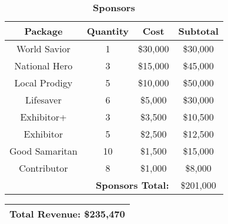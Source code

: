 \vspace{10mm}

\begin{table}[H]
\centering
\caption*{\textbf{Sponsors}}
\begin{tabular}{|c|c|c|c|}
\hline
    \textbf{Package} & \textbf{Quantity} & \textbf{Cost} & \textbf{Subtotal}	\\ 
\hline
	World Savior	&	1	&	\$30,000	&	\$30,000						\\
	National Hero	&	3	& 	\$15,000	&	\$45,000						\\
	Local Prodigy	&	5	& 	\$10,000	&	\$50,000						\\
	Lifesaver		&	6	& 	\$5,000		&	\$30,000						\\
	Exhibitor+		&	3	& 	\$3,500		&	\$10,500						\\
	Exhibitor		&	5	& 	\$2,500		&	\$12,500						\\
	Good Samaritan	&	10	& 	\$1,500		&	\$15,000						\\
	Contributor		&	8	& 	\$1,000		&	\$8,000							\\
\hline
	\multicolumn{3}{|r|}{\textbf{Sponsors Total:}}	&	\$201,000				\\
\hline
\end{tabular}
\end{table}

\vspace{10mm}

\begin{table}[H]
\centering
\begin{tabular}{|c|}
\hline
    \textbf{Total Revenue: \$235,470}\\ 
\hline
\end{tabular}
\end{table}



